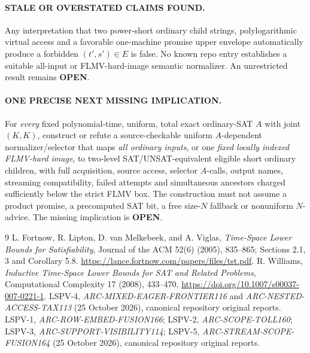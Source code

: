 \documentclass[11pt]{article}
\newcommand{\OPEN}{\textbf{OPEN}}
\begin{document}
\paragraph{STALE OR OVERSTATED CLAIMS FOUND.}
Any interpretation that two power-short ordinary child
strings, polylogarithmic virtual access and a favorable
one-machine promise upper envelope automatically
produce a forbidden \((t',s')\in E\) is false.
No known repo entry establishes a suitable all-input
or FLMV-hard-image semantic normalizer. An
unrestricted result remains \OPEN.

\paragraph{ONE PRECISE NEXT MISSING IMPLICATION.}
For \emph{every} fixed polynomial-time, uniform,
total exact ordinary-SAT \(A\) with joint \((K,K)\),
construct or refute a source-checkable uniform
\(A\)-dependent normalizer/selector that maps
\emph{all ordinary inputs}, or one \emph{fixed
locally indexed FLMV-hard image}, to
two-level SAT/UNSAT-equivalent eligible short
ordinary children, with full acquisition, source
access, selector \(A\)-calls, output names,
streaming compatibility, failed attempts and
simultaneous ancestors charged sufficiently below
the strict FLMV box. The construction must not
assume a product promise, a precomputed SAT bit,
a free size-\(N\) fallback or nonuniform \(N\)-advice.
The missing implication is \OPEN{}.

\begin{thebibliography}{9}
 L. Fortnow, R. Lipton, D. van Melkebeek,
and A. Viglas, \emph{Time-Space Lower Bounds for
Satisfiability}, Journal of the ACM 52(6) (2005),
835--865; Sections 2.1, 3 and Corollary 5.8.
\url{https://lance.fortnow.com/papers/files/tst.pdf}.
 R. Williams,
\emph{Inductive Time-Space Lower Bounds for SAT and Related Problems},
Computational Complexity 17 (2008), 433--470,
\url{https://doi.org/10.1007/s00037-007-0221-1}.
 LSPV-4, \emph{ARC-MIXED-EAGER-FRONTIER116}
and \emph{ARC-NESTED-ACCESS-TAX113} (25 October 2026),
canonical repository original reports.
 LSPV-1, \emph{ARC-ROW-EMBED-FUSION166};
LSPV-2, \emph{ARC-SCOPE-TOLL160};
LSPV-3, \emph{ARC-SUPPORT-VISIBILITY114};
LSPV-5, \emph{ARC-STREAM-SCOPE-FUSION164}
(25 October 2026), canonical repository original reports.
\end{thebibliography}
\end{document}
